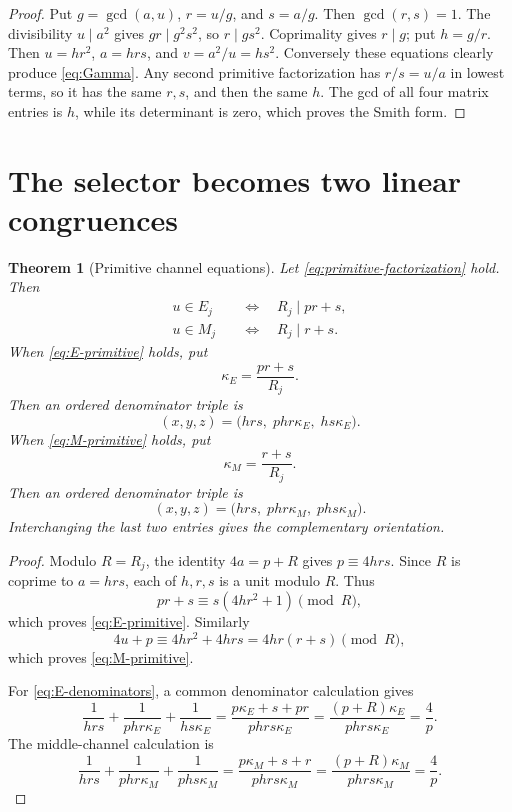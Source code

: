 \documentclass[11pt]{article}
\newtheorem{theorem}{Theorem}[section]
\theoremstyle{definition}
\theoremstyle{remark}
\begin{document}
\begin{proof}
Put $g=\gcd(a,u)$, $r=u/g$, and $s=a/g$.  Then $\gcd(r,s)=1$.
The divisibility $u\mid a^2$ gives $gr\mid g^2s^2$, so
$r\mid gs^2$.  Coprimality gives $r\mid g$; put $h=g/r$.  Then
$u=hr^2$, $a=hrs$, and $v=a^2/u=hs^2$.  Conversely these equations clearly
produce \eqref{eq:Gamma}.  Any second primitive factorization has
$r/s=u/a$ in lowest terms, so it has the same $r,s$, and then the same $h$.
The gcd of all four matrix entries is $h$, while its determinant is zero,
which proves the Smith form.
\end{proof}

\section{The selector becomes two linear congruences}

\begin{theorem}[Primitive channel equations]\label{thm:primitive-channels}
Let \eqref{eq:primitive-factorization} hold.  Then
\begin{align}
 u\in E_j
 &\quad\Longleftrightarrow\quad R_j\mid pr+s,
 \label{eq:E-primitive}\\
 u\in M_j
 &\quad\Longleftrightarrow\quad R_j\mid r+s.
 \label{eq:M-primitive}
\end{align}
When \eqref{eq:E-primitive} holds, put
\begin{equation}\label{eq:kappaE}
 \kappa_E=\frac{pr+s}{R_j}.
\end{equation}
Then an ordered denominator triple is
\begin{equation}\label{eq:E-denominators}
 (x,y,z)=\bigl(hrs,\;phr\kappa_E,\;hs\kappa_E\bigr).
\end{equation}
When \eqref{eq:M-primitive} holds, put
\begin{equation}\label{eq:kappaM}
 \kappa_M=\frac{r+s}{R_j}.
\end{equation}
Then an ordered denominator triple is
\begin{equation}\label{eq:M-denominators}
 (x,y,z)=\bigl(hrs,\;phr\kappa_M,\;phs\kappa_M\bigr).
\end{equation}
Interchanging the last two entries gives the complementary orientation.
\end{theorem}

\begin{proof}
Modulo $R=R_j$, the identity $4a=p+R$ gives
$p\equiv4hrs$.  Since $R$ is coprime to $a=hrs$, each of $h,r,s$ is a unit
modulo $R$.  Thus
\[
 pr+s\equiv s(4hr^2+1)\pmod R,
\]
which proves \eqref{eq:E-primitive}.  Similarly
\[
 4u+p\equiv4hr^2+4hrs=4hr(r+s)\pmod R,
\]
which proves \eqref{eq:M-primitive}.

For \eqref{eq:E-denominators}, a common denominator calculation gives
\[
 \frac1{hrs}+\frac1{phr\kappa_E}+\frac1{hs\kappa_E}
 =\frac{p\kappa_E+s+pr}{phrs\kappa_E}
 =\frac{(p+R)\kappa_E}{phrs\kappa_E}
 =\frac4p.
\]
The middle-channel calculation is
\[
 \frac1{hrs}+\frac1{phr\kappa_M}+\frac1{phs\kappa_M}
 =\frac{p\kappa_M+s+r}{phrs\kappa_M}
 =\frac{(p+R)\kappa_M}{phrs\kappa_M}
 =\frac4p.
\]
\end{proof}
\end{document}
